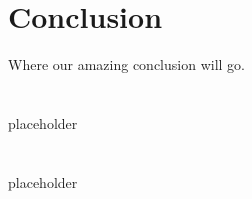 \documentclass[10pt,journal,compsoc]{IEEEtran}
\begin{document}




\section{Conclusion}
Where our amazing conclusion will go.

\newpage

%


\appendices
\section{}
placeholder

\section{}
placeholder
\end{document}
